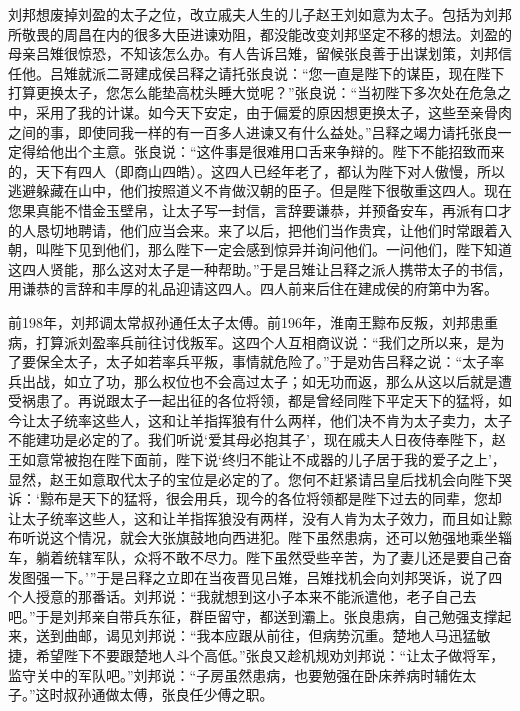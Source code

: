 刘邦想废掉刘盈的太子之位，改立戚夫人生的儿子赵王刘如意为太子。包括为刘邦所敬畏的周昌在内的很多大臣进谏劝阻，都没能改变刘邦坚定不移的想法。刘盈的母亲吕雉很惊恐，不知该怎么办。有人告诉吕雉，留候张良善于出谋划策，刘邦信任他。吕雉就派二哥建成侯吕释之请托张良说：“您一直是陛下的谋臣，现在陛下打算更换太子，您怎么能垫高枕头睡大觉呢？”张良说：“当初陛下多次处在危急之中，采用了我的计谋。如今天下安定，由于偏爱的原因想更换太子，这些至亲骨肉之间的事，即使同我一样的有一百多人进谏又有什么益处。”吕释之竭力请托张良一定得给他出个主意。张良说：“这件事是很难用口舌来争辩的。陛下不能招致而来的，天下有四人（即商山四皓）。这四人已经年老了，都认为陛下对人傲慢，所以逃避躲藏在山中，他们按照道义不肯做汉朝的臣子。但是陛下很敬重这四人。现在您果真能不惜金玉壁帛，让太子写一封信，言辞要谦恭，并预备安车，再派有口才的人恳切地聘请，他们应当会来。来了以后，把他们当作贵宾，让他们时常跟着入朝，叫陛下见到他们，那么陛下一定会感到惊异并询问他们。一问他们，陛下知道这四人贤能，那么这对太子是一种帮助。”于是吕雉让吕释之派人携带太子的书信，用谦恭的言辞和丰厚的礼品迎请这四人。四人前来后住在建成侯的府第中为客。

前198年，刘邦调太常叔孙通任太子太傅。前196年，淮南王黥布反叛，刘邦患重病，打算派刘盈率兵前往讨伐叛军。这四个人互相商议说：“我们之所以来，是为了要保全太子，太子如若率兵平叛，事情就危险了。”于是劝告吕释之说：“太子率兵出战，如立了功，那么权位也不会高过太子；如无功而返，那么从这以后就是遭受祸患了。再说跟太子一起出征的各位将领，都是曾经同陛下平定天下的猛将，如今让太子统率这些人，这和让羊指挥狼有什么两样，他们决不肯为太子卖力，太子不能建功是必定的了。我们听说‘爱其母必抱其子’，现在戚夫人日夜侍奉陛下，赵王如意常被抱在陛下面前，陛下说‘终归不能让不成器的儿子居于我的爱子之上’，显然，赵王如意取代太子的宝位是必定的了。您何不赶紧请吕皇后找机会向陛下哭诉：‘黥布是天下的猛将，很会用兵，现今的各位将领都是陛下过去的同辈，您却让太子统率这些人，这和让羊指挥狼没有两样，没有人肯为太子效力，而且如让黥布听说这个情况，就会大张旗鼓地向西进犯。陛下虽然患病，还可以勉强地乘坐辎车，躺着统辖军队，众将不敢不尽力。陛下虽然受些辛苦，为了妻儿还是要自己奋发图强一下。’”于是吕释之立即在当夜晋见吕雉，吕雉找机会向刘邦哭诉，说了四个人授意的那番话。刘邦说：“我就想到这小子本来不能派遣他，老子自己去吧。”于是刘邦亲自带兵东征，群臣留守，都送到灞上。张良患病，自己勉强支撑起来，送到曲邮，谒见刘邦说：“我本应跟从前往，但病势沉重。楚地人马迅猛敏捷，希望陛下不要跟楚地人斗个高低。”张良又趁机规劝刘邦说：“让太子做将军，监守关中的军队吧。”刘邦说：“子房虽然患病，也要勉强在卧床养病时辅佐太子。”这时叔孙通做太傅，张良任少傅之职。

